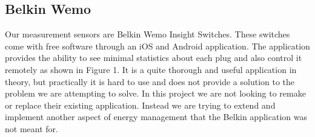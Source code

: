 \documentclass{sig-alternate-05-2015}
\begin{document}
\subsection{Belkin Wemo}
Our measurement sensors are Belkin Wemo Insight Switches. These switches come with free software through an iOS and Android application. The application provides the ability to see minimal statistics about each plug and also control it remotely as shown in Figure 1. It is a quite thorough and useful application in theory, but practically it is hard to use and does not provide a solution to the problem we are attempting to solve. In this project we are not looking to remake or replace their existing application. Instead we are trying to extend and implement another aspect of energy management that the Belkin application was not meant for.
\end{document}
